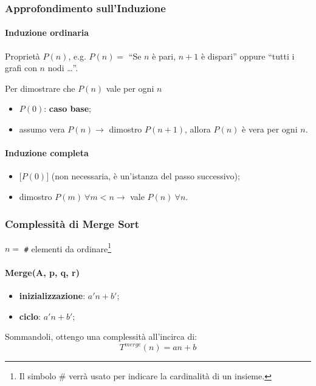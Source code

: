 \subsubsection{Approfondimento sull'Induzione}
\paragraph{Induzione ordinaria} 
Proprietà $P(n)$, e.g.  $P(n) = $ ``Se $n$ è pari, $n+1$ è dispari'' oppure 
``tutti i grafi con $n$ nodi \dots ''.\par
Per dimostrare che $P(n)$ vale per ogni $n$
\begin{itemize}
	\item $P(0)$: \textbf{caso base};
	\item assumo vera $P(n) \rightarrow $ dimostro $P(n+1)$, allora $P(n)$
	è vera per ogni $n$.
\end{itemize}

\paragraph{Induzione completa}
\begin{itemize}
	\item $\big[ P(0) \big]$ (non necessaria, è un'istanza del passo successivo);
	\item dimostro $P(m) \ \forall m<n \rightarrow $ vale $P(n) \ \forall n$.  
\end{itemize}

\subsubsection{Complessità di Merge Sort}

$n =$ \verb|#| elementi da ordinare\footnote{Il simbolo \# verrà usato per indicare la cardinalità di un insieme.}

\paragraph{Merge(A, p, q, r)}
\begin{itemize}
	\item[] \textbf{inizializzazione}: $a'n+b'$;
	\item[] \textbf{ciclo}: $a'n+b'$;
\end{itemize}

Sommandoli, ottengo una complessità all'incirca di:
\begin{displaymath}
	T^{merge}(n) = an+b
\end{displaymath}

